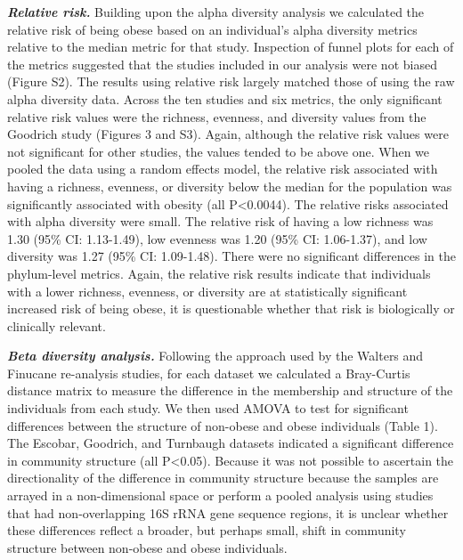 \documentclass[12pt,]{article}
\begin{document}
\textbf{\emph{Relative risk.}} Building upon the alpha diversity
analysis we calculated the relative risk of being obese based on an
individual's alpha diversity metrics relative to the median metric for
that study. Inspection of funnel plots for each of the metrics suggested
that the studies included in our analysis were not biased (Figure S2).
The results using relative risk largely matched those of using the raw
alpha diversity data. Across the ten studies and six metrics, the only
significant relative risk values were the richness, evenness, and
diversity values from the Goodrich study (Figures 3 and S3). Again,
although the relative risk values were not significant for other
studies, the values tended to be above one. When we pooled the data
using a random effects model, the relative risk associated with having a
richness, evenness, or diversity below the median for the population was
significantly associated with obesity (all P\textless{}0.0044). The
relative risks associated with alpha diversity were small. The relative
risk of having a low richness was 1.30 (95\% CI: 1.13-1.49), low
evenness was 1.20 (95\% CI: 1.06-1.37), and low diversity was 1.27 (95\%
CI: 1.09-1.48). There were no significant differences in the
phylum-level metrics. Again, the relative risk results indicate that
individuals with a lower richness, evenness, or diversity are at
statistically significant increased risk of being obese, it is
questionable whether that risk is biologically or clinically relevant.

\textbf{\emph{Beta diversity analysis.}} Following the approach used by
the Walters and Finucane re-analysis studies, for each dataset we
calculated a Bray-Curtis distance matrix to measure the difference in
the membership and structure of the individuals from each study. We then
used AMOVA to test for significant differences between the structure of
non-obese and obese individuals (Table 1). The Escobar, Goodrich, and
Turnbaugh datasets indicated a significant difference in community
structure (all P\textless{}0.05). Because it was not possible to
ascertain the directionality of the difference in community structure
because the samples are arrayed in a non-dimensional space or perform a
pooled analysis using studies that had non-overlapping 16S rRNA gene
sequence regions, it is unclear whether these differences reflect a
broader, but perhaps small, shift in community structure between
non-obese and obese individuals.
\end{document}
